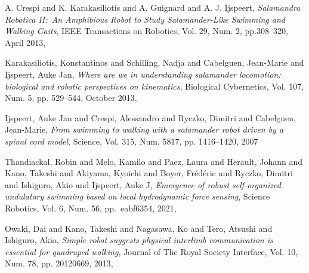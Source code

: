 \documentclass{cmc}
\begin{document}
\begin{thebibliography}{9}

  A. Crespi and K. Karakasiliotis and A. Guignard and A. J. Ijspeert,
  \emph{Salamandra Robotica II:\ An Amphibious Robot to Study Salamander-Like Swimming and Walking Gaits},
  IEEE Transactions on Robotics, Vol. 29, Num. 2, pp.308--320, April 2013,

  Karakasiliotis, Konstantinos and Schilling, Nadja and Cabelguen, Jean-Marie and Ijspeert, Auke Jan,
  \emph{Where are we in understanding salamander locomotion: biological and robotic perspectives on kinematics},
  Biological Cybernetics, Vol. 107, Num. 5, pp. 529--544, October 2013,

  Ijspeert, Auke Jan and Crespi, Alessandro and Ryczko, Dimitri and Cabelguen, Jean-Marie,
  \emph{From swimming to walking with a salamander robot driven by a spinal cord model},
  Science, Vol. 315, Num. 5817, pp. 1416--1420, 2007

  Thandiackal, Robin and Melo, Kamilo and Paez, Laura and Herault, Johann and Kano, Takeshi and Akiyama, Kyoichi and Boyer, Fr{\'e}d{\'e}ric and Ryczko, Dimitri and Ishiguro, Akio and Ijspeert, Auke J,
  \emph{Emergence of robust self-organized undulatory swimming based on local hydrodynamic force sensing},
  Science Robotics, Vol. 6, Num. 56, pp.\ eabf6354, 2021,

  Owaki, Dai and Kano, Takeshi and Nagasawa, Ko and Tero, Atsushi and Ishiguro, Akio,
  \emph{Simple robot suggests physical interlimb communication is essential for quadruped walking},
  Journal of The Royal Society Interface, Vol. 10, Num. 78, pp. 20120669, 2013,

\end{thebibliography}


\end{document}
